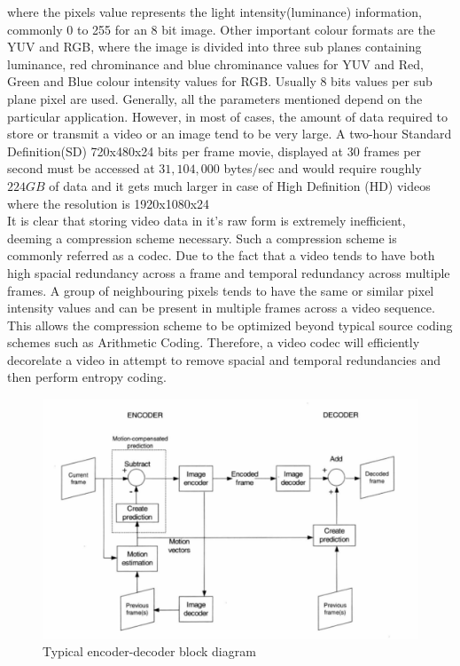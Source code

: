 \documentclass[a4paper,11pt,oneside]{article}
\begin{document}
where the pixels value represents the light intensity(luminance) information, commonly 0 to 255 for an 8 bit image. Other important colour formats are the YUV and RGB, where the
image is divided into three sub planes containing luminance, red chrominance and blue chrominance values for YUV and Red, Green and Blue colour intensity values for RGB. Usually 8
bits values per sub plane pixel   are used. Generally, all the parameters mentioned depend on the particular application. However, in most of cases, the amount of data required to
store or transmit a video or an image tend to be very large. A two-hour Standard Definition(SD) 720x480x24 bits per frame movie, displayed at 30 frames per second must be accessed
at $ 31,104,000 $ bytes/sec
and would require roughly $224 GB$ of data and it gets much larger in case of High Definition (HD) videos where the resolution is 1920x1080x24 \cite[p.~525-526]{gonzalez2008digital} \\
\indent It is clear that storing video data in it's raw form is extremely inefficient, deeming a compression scheme necessary. Such a compression scheme is commonly referred as a codec.
Due to the fact that a video tends to have both high spacial redundancy across a frame and temporal redundancy across multiple frames. A group of neighbouring pixels tends to have
the same or similar pixel intensity values and can be present in multiple frames across a video sequence. This allows the compression scheme to be optimized beyond typical source coding
schemes such as Arithmetic Coding. Therefore, a video codec will efficiently decorelate a video in attempt to remove spacial and temporal redundancies and then perform entropy coding.\\

\begin{figure}
  \centering
  \includegraphics[width=\textwidth]{../figures/f1_codec_block_diagram.pdf}
  \caption{Typical encoder-decoder block diagram\cite[p.~44]{richardson2002video}}
  \label{figure:codec_block_diagram}
\end{figure}
\end{document}
